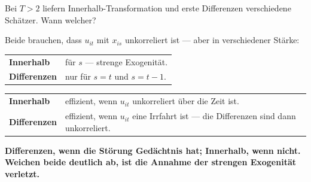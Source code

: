 \begin{aufgabe}
Bei $T > 2$ liefern Innerhalb-Transformation und erste Differenzen verschiedene Schätzer. Wann welcher?

\loesung
{}
Beide brauchen, dass $u_{it}$ mit $x_{is}$ unkorreliert ist --- aber in verschiedener Stärke:
\begin{center}
{\small
\renewcommand{\arraystretch}{1.5}
\begin{tabular}{@{}P{2.4cm}P{6.2cm}@{}}
\toprule
\textbf{Innerhalb} & für  $s$ --- strenge Exogenität.\\
\textbf{Differenzen} & nur für $s = t$ und $s = t-1$.\\
\bottomrule
\end{tabular}}
\end{center}

\begin{center}
{\small
\renewcommand{\arraystretch}{1.5}
\begin{tabular}{@{}P{2.4cm}P{6.2cm}@{}}
\toprule
\textbf{Innerhalb} & effizient, wenn $u_{it}$ unkorreliert über die Zeit ist.\\
\textbf{Differenzen} & effizient, wenn $u_{it}$ eine Irrfahrt ist --- die Differenzen sind dann unkorreliert.\\
\bottomrule
\end{tabular}}
\end{center}

\begin{center}
\begin{minipage}{0.9\textwidth}
\textbf{Differenzen, wenn die Störung Gedächtnis hat; Innerhalb, wenn nicht. Weichen beide deutlich ab, ist die Annahme der strengen Exogenität verletzt.}
\end{minipage}
\end{center}

\begin{center}
\begin{minipage}{0.88\textwidth}
\end{minipage}
\end{center}
\end{aufgabe}

